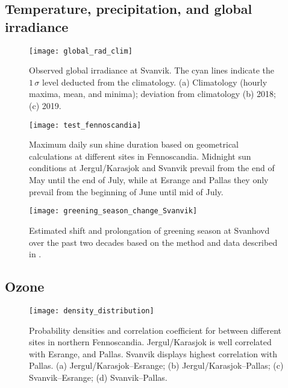 \documentclass[bg, manuscript]{copernicus}
\begin{document}
\subsection{Temperature, precipitation, and global irradiance}     %

\appendixfigures  %
\begin{figure}[t]
  \texttt{[image: global\_rad\_clim]}
  \caption{Observed global irradiance at Svanvik. The cyan lines indicate the $1\,\sigma$ level deducted from the climatology. (a) Climatology (hourly maxima, mean, and minima); deviation from climatology (b) 2018; (c) 2019.}
  \label{fig:global_rad_clim}
\end{figure}

\begin{figure}[t]
  \texttt{[image: test\_fennoscandia]}
  \caption{Maximum daily sun shine duration based on geometrical calculations at different sites in Fennoscandia. Midnight sun conditions at Jergul/Karasjok and Svanvik prevail from the end of May until the end of July, while at Esrange and Pallas they only prevail from the beginning of June until mid of July.}
  \label{fig:sunlight_fennoscandia}
\end{figure}

\begin{figure}[t]
  \texttt{[image: greening\_season\_change\_Svanvik]}
  \caption{Estimated shift and prolongation of greening season at Svanhovd over the past two decades based on the method and data described in \citet{GMD:Falk2019}.}
  \label{fig:greening_season_change_Svanvik}
\end{figure}
\clearpage


\subsection{Ozone}

\begin{figure}[t]
  \texttt{[image: density\_distribution]}
  \caption{Probability densities and correlation coefficient for \chem{[O_3]} between different sites in northern Fennoscandia. Jergul/Karasjok is well correlated with Esrange, and Pallas. Svanvik displays highest correlation with Pallas. (a) Jergul/Karasjok--Esrange; (b) Jergul/Karasjok--Pallas; (c) Svanvik--Esrange; (d) Svanvik--Pallas.}
  \label{fig:density_distribution}
\end{figure}
\end{document}
